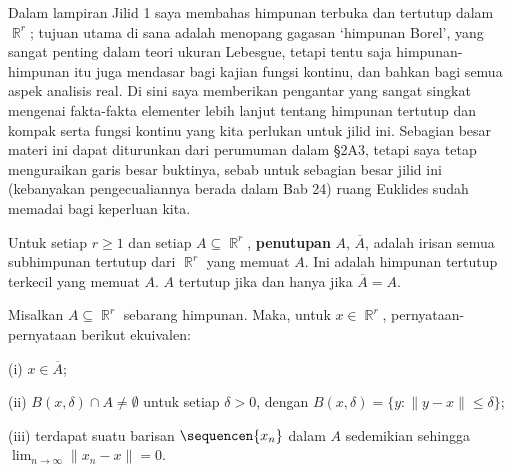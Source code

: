 
\def\chaptername{Lampiran}
\def\sectionname{Topologi ruang Euklides}


Dalam lampiran Jilid 1 saya membahas himpunan terbuka dan
tertutup dalam $\BbbR^r$; tujuan utama di sana adalah menopang gagasan
`himpunan Borel', yang sangat penting dalam teori ukuran Lebesgue, tetapi
tentu saja himpunan-himpunan itu juga mendasar bagi kajian fungsi kontinu,
dan bahkan bagi semua aspek analisis real.
Di sini saya memberikan pengantar yang sangat singkat mengenai fakta-fakta
elementer lebih lanjut tentang himpunan tertutup dan kompak serta fungsi
kontinu yang kita perlukan untuk jilid ini. Sebagian besar materi ini dapat
diturunkan dari perumuman dalam \S2A3, tetapi saya tetap menguraikan garis
besar buktinya, sebab untuk sebagian besar jilid ini (kebanyakan
pengecualiannya berada dalam Bab 24) ruang Euklides sudah memadai bagi
keperluan kita.

 Untuk setiap $r\ge 1$ dan setiap
$A\subseteq\BbbR^r$, {\bf penutupan} $A$, $\overline{A}$, adalah irisan
semua subhimpunan tertutup dari $\BbbR^r$ yang memuat $A$.
Ini adalah
himpunan tertutup terkecil yang memuat $A$. $A$ tertutup
jika dan hanya jika $\overline{A}=A$.

 Misalkan $A\subseteq\BbbR^r$ sebarang himpunan. Maka,
untuk $x\in\BbbR^r$, pernyataan-pernyataan berikut ekuivalen:

(i) $x\in\overline{A}$;

(ii) $B(x,\delta)\cap A\ne\emptyset$ untuk setiap $\delta>0$, dengan
$B(x,\delta)=\{y:\|y-x\|\le\delta\}$;

(iii) terdapat suatu barisan $\sequencen{x_n}$ dalam $A$ sedemikian sehingga
$\lim_{n\to\infty}\|x_n-x\|=0$.


